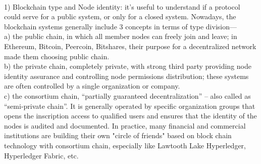\documentclass[doublespacing]{bmcart}
\begin{document}
\begin{CJK*}{UTF8}{gbsn}
\paragraph{}
1) Blockchain type and Node identity: it’s useful to understand if a protocol could serve for a public system, or only for a closed system. Nowadays, the blockchain systems generally include 3 concepts in terms of type division—
\\a)  the public chain, in which all member nodes can freely join and leave; in Ethereum, Bitcoin, Peercoin, Bitshares, their purpose for a decentralized network made them choosing public chain.
\\b) the private chain, completely private, with strong third party providing node identity assurance and controlling node permissions distribution; these systems are often controlled by a single organization or company.
\\c) the consortium chain, ``partially guaranteed decentralization'' – also called as ``semi-private chain''. It is generally operated by specific organization groups that opens the inscription access to qualified users and ensures that the identity of the nodes is audited and documented. In practice, many financial and commercial institutions are building their own "circle of friends" based on block chain technology with consortium chain, especially like Lawtooth Lake Hyperledger, Hyperledger Fabric, etc.
\paragraph{}


\end{CJK*}
\end{document}
